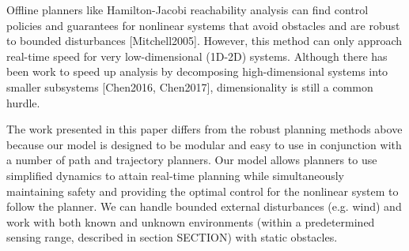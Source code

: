 Offline planners like Hamilton-Jacobi reachability analysis can find control policies and guarantees for nonlinear systems that avoid obstacles and are robust to bounded disturbances [Mitchell2005].  However, this method can only approach real-time speed for very low-dimensional (1D-2D) systems. Although there has been work to speed up analysis by decomposing high-dimensional systems into smaller subsystems [Chen2016, Chen2017], dimensionality is still a common hurdle.

The work presented in this paper differs from the robust planning methods above because our model is designed to be modular and easy to use in conjunction with a number of path and trajectory planners.  Our model allows planners to use simplified dynamics to attain real-time planning while simultaneously maintaining safety and providing the optimal control for the nonlinear system to follow the planner. We can handle bounded external disturbances (e.g. wind) and work with both known and unknown environments (within a predetermined sensing range, described in section SECTION) with static obstacles. 

